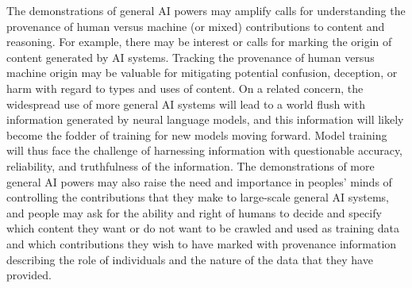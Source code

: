 The demonstrations of general AI powers may amplify calls for understanding the provenance of human versus machine (or mixed) contributions to content and reasoning.  For example, there may be interest or calls for marking the origin of content generated by AI systems. Tracking the provenance of human versus machine origin may be valuable for mitigating potential confusion, deception, or harm with regard to types and uses of content. On a related concern, the widespread use of more general AI systems will lead to a world flush with information generated by neural language models, and this information will likely become the fodder of training for new models moving forward. Model training will thus face the challenge of harnessing information with questionable accuracy, reliability, and truthfulness of the information. The demonstrations of more general AI powers may also raise the need and importance in peoples’ minds of controlling the contributions that they make to large-scale general AI systems, and people may ask for the ability and right of humans to decide and specify which content they want or do not want to be crawled and used as training data and which contributions they wish to have marked with provenance information describing the role of individuals and the nature of the data that they have provided. 










